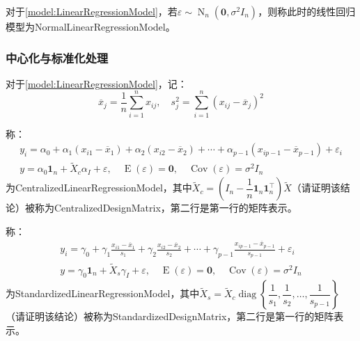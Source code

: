 \begin{definition}\label{model:NormalLinearRegressionModel}
	对于\cref{model:LinearRegressionModel}，若$\varepsilon\sim\operatorname{N}_n(\mathbf{0},\sigma^2I_n)$，则称此时的线性回归模型为\gls{NormalLinearRegressionModel}。
\end{definition}
\subsubsection{中心化与标准化处理}
\begin{definition}\label{model:CentralizedStandardizedLinearModel}
	对于\cref{model:LinearRegressionModel}，记：
	\begin{equation*}
		\overline{x}_j=\frac{1}{n}\sum_{i=1}^{n}x_{ij},\quad s_j^2=\sum_{i=1}^{n}(x_{ij}-\overline{x}_j)^2
	\end{equation*}\par
	称：
	\begin{gather*}
		y_i=\alpha_0+\alpha_1(x_{i1}-\overline{x}_1)+\alpha_2(x_{i2}-\overline{x}_2)+\cdots+\alpha_{p-1}(x_{ip-1}-\overline{x}_{p-1})+\varepsilon_i \\
		y=\alpha_0\mathbf{1}_n+\tilde{X}_c\alpha_I+\varepsilon,\quad\operatorname{E}(\varepsilon)=\mathbf{0},\quad\operatorname{Cov}(\varepsilon)=\sigma^2I_n
	\end{gather*}
	为\gls{CentralizedLinearRegressionModel}，其中$\tilde{X}_c=\left(I_n-\dfrac{1}{n}\mathbf{1}_n\mathbf{1}_n^{\top}\right)\tilde{X}$（请证明该结论）被称为\gls{CentralizedDesignMatrix}，第二行是第一行的矩阵表示。\par
	称：
	\begin{gather*}
		y_i=\gamma_0+\gamma_1\frac{x_{i1}-\overline{x}_1}{s_1}+\gamma_2\frac{x_{i2}-\overline{x}_2}{s_2}+\cdots+\gamma_{p-1}\frac{x_{ip-1}-\overline{x}_{p-1}}{s_{p-1}}+\varepsilon_i \\
		y=\gamma_0\mathbf{1}_n+\tilde{X}_s\gamma_I+\varepsilon,\quad\operatorname{E}(\varepsilon)=\mathbf{0},\quad\operatorname{Cov}(\varepsilon)=\sigma^2I_n
	\end{gather*}
	为\gls{StandardizedLinearRegressionModel}，其中$\tilde{X}_s=\tilde{X}_c\operatorname{diag}\left\{\dfrac{1}{s_1},\dfrac{1}{s_2},\dots,\dfrac{1}{s_{p-1}}\right\}$（请证明该结论）被称为\gls{StandardizedDesignMatrix}，第二行是第一行的矩阵表示。
\end{definition}
